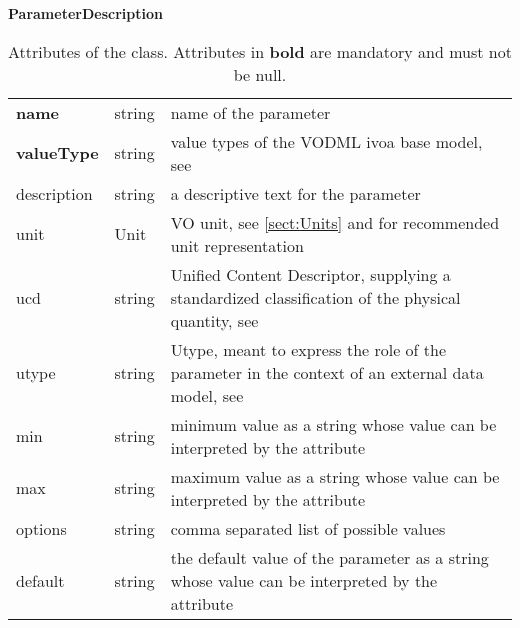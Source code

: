 \begin{table}[ht]
\small
{}\textwidth
\textbf{\normalsize ParameterDescription}\vspace{0.25em}\\
\begin{tabulary}{1.0\textwidth}{lLL}
 \toprule
  &    & \\
 \midrule
\textbf{name} & string & name of the parameter \\
\textbf{valueType} & string & value types of the VODML ivoa base model, see \citet{2018ivoa.spec.0910L} \\
description & string  & a descriptive text for the parameter \\
unit        & Unit  & VO unit, see \ref{sect:Units} and \citet{2014ivoa.spec.0523D} for recommended unit representation \\
ucd         & string  & Unified Content Descriptor, supplying a standardized classification of the physical quantity, see \citet{2018ivoa.spec.0527M} \\
utype       & string  & Utype, meant to express the role of the parameter in the context of an external data model, see \citet{note:utypeusage} \\
min         & string & minimum value as a string whose value can be interpreted by the  attribute \\
max         & string & maximum value as a string whose value can be interpreted by the  attribute\\
options     & string & comma separated list of possible values\\
default     & string & the default value of the parameter as a string whose value can be interpreted by the  attribute \\
\bottomrule
\end{tabulary}
\caption[Attributes of the  class]{Attributes of the   class. Attributes in \textbf{bold} are mandatory and must not be null.}
\label{tab:Paramdescription}
\end{table}

